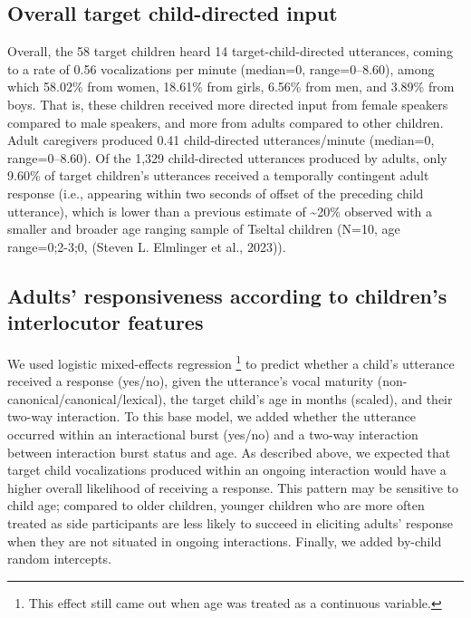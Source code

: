 \documentclass[
  man]{apa6}
\begin{document}
\hypertarget{overall-target-child-directed-input}{%
\subsection{Overall target child-directed input}\label{overall-target-child-directed-input}}

Overall, the 58 target children heard 14 target-child-directed utterances, coming to a rate of 0.56 vocalizations per minute (median=0, range=0--8.60), among which 58.02\% from women, 18.61\% from girls, 6.56\% from men, and 3.89\% from boys. That is, these children received more directed input from female speakers compared to male speakers, and more from adults compared to other children. Adult caregivers produced 0.41 child-directed utterances/minute (median=0, range=0--8.60). Of the 1,329 child-directed utterances produced by adults, only 9.60\% of target children's utterances received a temporally contingent adult response (i.e., appearing within two seconds of offset of the preceding child utterance), which is lower than a previous estimate of \textasciitilde20\% observed with a smaller and broader age ranging sample of Tseltal children (N=10, age range=0;2-3;0, (Steven L. Elmlinger et al., 2023)).

\hypertarget{adults-responsiveness-according-to-childrens-interlocutor-features}{%
\subsection{Adults' responsiveness according to children's interlocutor features}\label{adults-responsiveness-according-to-childrens-interlocutor-features}}

We used logistic mixed-effects regression \footnote{This effect still came out when age was treated as a continuous variable.} to predict whether a child's utterance received a response (yes/no), given the utterance's vocal maturity (non-canonical/canonical/lexical), the target child's age in months (scaled), and their two-way interaction. To this base model, we added whether the utterance occurred within an interactional burst (yes/no) and a two-way interaction between interaction burst status and age. As described above, we expected that target child vocalizations produced within an ongoing interaction would have a higher overall likelihood of receiving a response. This pattern may be sensitive to child age; compared to older children, younger children who are more often treated as side participants are less likely to succeed in eliciting adults' response when they are not situated in ongoing interactions. Finally, we added by-child random intercepts.
\end{document}
